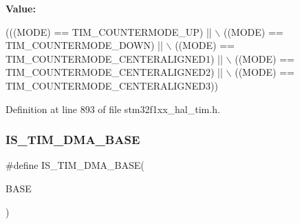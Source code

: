 {\bfseries Value\+:}
\begin{DoxyCode}
(((MODE) == TIM\_COUNTERMODE\_UP)              || \(\backslash\)
                                   ((MODE) == TIM\_COUNTERMODE\_DOWN)            || \(\backslash\)
                                   ((MODE) == TIM\_COUNTERMODE\_CENTERALIGNED1)  || \(\backslash\)
                                   ((MODE) == TIM\_COUNTERMODE\_CENTERALIGNED2)  || \(\backslash\)
                                   ((MODE) == TIM\_COUNTERMODE\_CENTERALIGNED3))
\end{DoxyCode}


Definition at line 893 of file stm32f1xx\+\_\+hal\+\_\+tim.\+h.

\mbox{\label{group___t_i_m___private___macros_gaf565551f2619b1368fed7ef1ba7414de}} 
\subsubsection{\texorpdfstring{I\+S\+\_\+\+T\+I\+M\+\_\+\+D\+M\+A\+\_\+\+B\+A\+SE}{IS\_TIM\_DMA\_BASE}}
{\footnotesize\ttfamily \#define I\+S\+\_\+\+T\+I\+M\+\_\+\+D\+M\+A\+\_\+\+B\+A\+SE(\begin{DoxyParamCaption}\item[{}]{B\+A\+SE }\end{DoxyParamCaption})}

